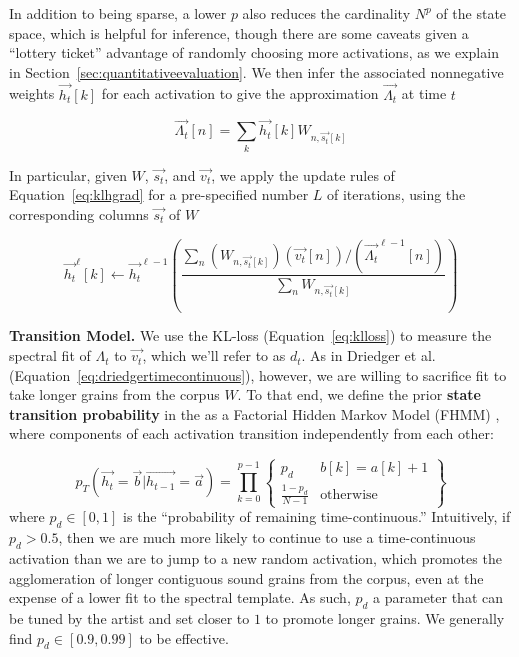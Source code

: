 \documentclass{article}
\begin{document}
    In addition to being sparse, a lower $p$ also reduces the cardinality $N^p$ of the state space, which is helpful for inference, though there are some caveats given a ``lottery ticket'' advantage of randomly choosing more activations, as we explain in Section~\ref{sec:quantitativeevaluation}.  We then infer the associated nonnegative weights $\vec{h_t}[k]$ for each activation to give the approximation $\vec{\Lambda_t}$ at time $t$
    
    \begin{equation}
        \label{eq:approximation}
        \vec{\Lambda_t}[n] = \sum_{k} \vec{h_t}[k]  W_{n, \vec{s_t}[k]}
    \end{equation}

    In particular, given $W$, $\vec{s_t}$, and $\vec{v_t}$, we apply the update rules of Equation~\ref{eq:klhgrad} for a pre-specified number $L$ of iterations, using the corresponding columns $\vec{s_t}$ of $W$

    \begin{equation}
        \label{eq:sparseklhgrad}
        \vec{h_t}^{\ell}[k]  \gets \vec{h_t}^{\ell-1} \left(  \frac{\sum_n (W_{n, \vec{s_t}[k]}) (\vec{v_t}[n]) / (\vec{\Lambda_t}^{\ell-1}[n]) }{ \sum_{n} W_{n, \vec{s_t}[k]}} \right)
    \end{equation}
    

    \textbf{Transition Model.} We use the KL-loss (Equation~\ref{eq:klloss}) to measure the spectral fit of $\Lambda_t$ to $\vec{v_t}$, which we'll refer to as $d_t$.  As in Driedger et al. \cite{driedger2015let} (Equation~\ref{eq:driedgertimecontinuous}), however, we are willing to sacrifice fit to take longer grains from the corpus $W$.  To that end, we define the prior  \textbf{state transition probability} in the as a Factorial Hidden Markov Model (FHMM) \cite{ghahramani1995factorial}, where components of each activation transition independently from each other:

    \begin{equation}
        \label{eq:transitionprob}
        p_T(\vec{h_t} = \vec{b} | \vec{h_{t-1}} = \vec{a}) = \prod_{k=0}^{p-1} \left\{  \begin{array}{cc}  p_d & b[k] = a[k]+1  \\ \frac{1-p_d}{N-1} & \text{otherwise} \end{array} \right\}
    \end{equation}
    where $p_d \in [0, 1]$ is the ``probability of remaining time-continuous.''  Intuitively, if $p_d > 0.5$, then we are much more likely to continue to use a time-continuous activation than we are to jump to a new random activation, which promotes the agglomeration of longer contiguous sound grains from the corpus, even at the expense of a lower fit to the spectral template.  As such, $p_d$ a parameter that can be tuned by the artist and set closer to $1$ to promote longer grains.  We generally find $p_d \in [0.9, 0.99]$ to be effective.
\end{document}
